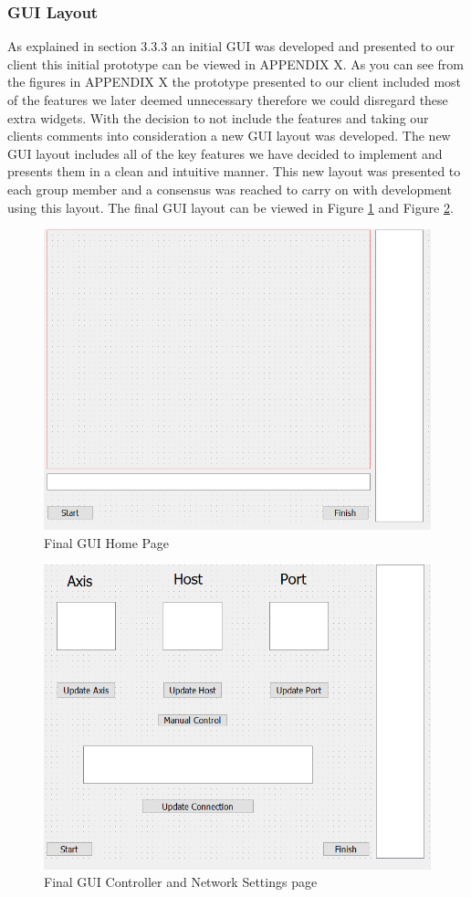 \subsubsection{GUI Layout}
As explained in section 3.3.3 an initial GUI was developed and presented to our client this initial prototype can be viewed in APPENDIX X. As you can see from the figures in APPENDIX X the prototype presented to our client included most of the features we later deemed unnecessary therefore we could disregard these extra widgets. With the decision to not include the features and taking our clients comments into consideration a new GUI layout was developed. The new GUI layout includes all of the key features we have decided to implement and presents them in a clean and intuitive manner. This new layout was presented to each group member and a consensus was reached to carry on with development using this layout. The final GUI layout can be viewed in Figure \ref{fig:GUIHome} and Figure \ref{fig:GUICtrl}.
\begin{figure}[H]
	\includegraphics[width=\linewidth]{Final_GUI_HOME.png}
	\caption{Final GUI Home Page}
	\label{fig:GUIHome}
\end{figure}
\begin{figure}[H]
	\includegraphics[width=\linewidth]{Final_GUI_CTRL.png}
	\caption{Final GUI Controller and Network Settings page}
	\label{fig:GUICtrl}
\end{figure}
